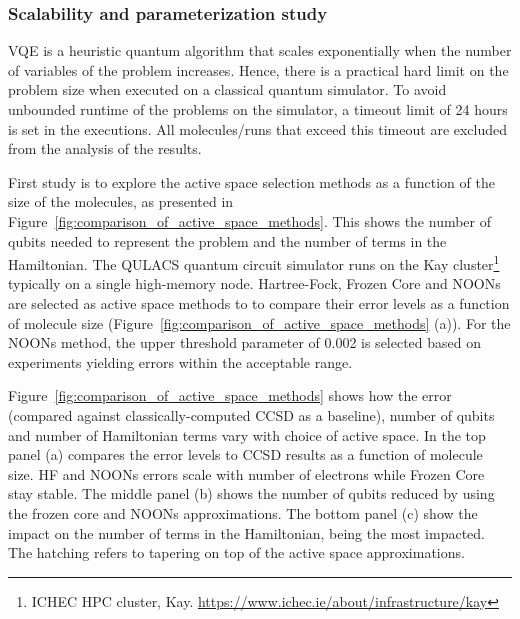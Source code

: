 \documentclass[journal,onecolumn]{IEEEtran}
\begin{document}
\subsubsection{Scalability and parameterization study}
\label{sec:results_from_quantum_computing_software_emulation}
VQE is a heuristic quantum algorithm that scales exponentially when the number of variables of the problem increases.
Hence, there is a practical hard limit on the problem size when executed on a classical quantum simulator.
To avoid unbounded runtime of the problems on the simulator, a timeout limit of 24 hours is set in the executions. 
All molecules/runs that exceed this timeout are excluded from the analysis of the results.

First study is to explore the active space selection methods as a function of the size of the molecules, as presented in Figure~\ref{fig:comparison_of_active_space_methods}. 
This shows the number of qubits needed to represent the problem and the number of terms in the Hamiltonian.
The QULACS quantum circuit simulator runs on the Kay cluster\footnote{ICHEC HPC cluster, Kay. \url{https://www.ichec.ie/about/infrastructure/kay}} typically on a single high-memory node. 
Hartree-Fock, Frozen Core and NOONs are selected as active space methods to to compare their error levels as a function of molecule size (Figure~\ref{fig:comparison_of_active_space_methods} (a)).
For the NOONs method, the upper threshold parameter of 0.002 is selected based on experiments yielding errors within the acceptable range.

Figure~\ref{fig:comparison_of_active_space_methods} shows how the error (compared against classically-computed CCSD as a baseline), number of qubits and number of Hamiltonian terms vary with choice of active space. 
In the top panel (a) compares the error levels to CCSD results as a function of molecule size.
HF and NOONs errors scale with number of electrons while Frozen Core stay stable. 
The middle panel (b) shows the number of qubits reduced by using the frozen core and NOONs approximations. 
The bottom panel (c) show the impact on the number of terms in the Hamiltonian,  being the most impacted. 
The hatching refers to tapering on top of the active space approximations.
\end{document}

